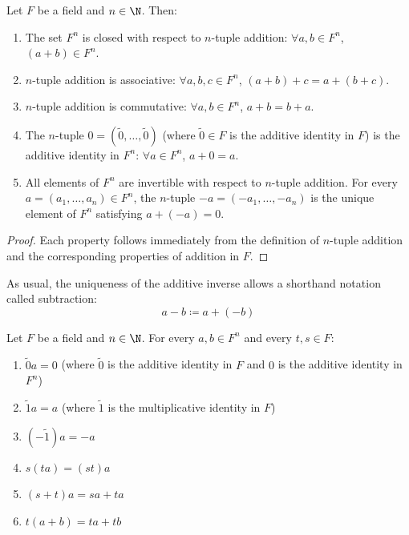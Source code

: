 \begin{theorem}\label{thm:tuple-addition-properties}
    Let $F$ be a field and $n \in \N$. Then:
    \begin{enumerate}[label=\roman*.]
        \item The set $F^n$ is closed with respect to $n$-tuple addition: $\forall a, b \in F^n$, $(a + b) \in F^n$.
        \item $n$-tuple addition is associative: $\forall a, b, c \in F^n$, $(a + b) + c = a + (b + c)$.
        \item $n$-tuple addition is commutative: $\forall a, b \in F^n$, $a + b = b + a$.
        \item The $n$-tuple $0 = (\tilde{0}, \ldots, \tilde{0})$ (where $\tilde{0} \in F$ is the additive identity in $F$) is the additive identity in $F^n$: $\forall a \in F^n$, $a + 0 = a$.
        \item All elements of $F^n$ are invertible with respect to $n$-tuple addition. For every $a = (a_1, \ldots, a_n) \in F^n$, the $n$-tuple $-a = (-a_1, \ldots, -a_n)$ is the unique element of $F^n$ satisfying $a + (-a) = 0$.
    \end{enumerate}
\end{theorem}

\begin{proof}
    Each property follows immediately from the definition of $n$-tuple addition and the corresponding properties of addition in $F$.
\end{proof}

\begin{notation}
    As usual, the uniqueness of the additive inverse allows a shorthand notation called subtraction:
    \[
    a - b \coloneqq a + (-b)
    \]
\end{notation}

\begin{theorem}\label{thm:scalar-mult-properties}
    Let $F$ be a field and $n \in \N$. For every $a, b \in F^n$ and every $t, s \in F$:
    \begin{enumerate}[label=\roman*.]
        \item $\tilde{0}a = 0$ (where $\tilde{0}$ is the additive identity in $F$ and $0$ is the additive identity in $F^n$)
        \item $\tilde{1}a = a$ (where $\tilde{1}$ is the multiplicative identity in $F$)
        \item $(-\tilde{1})a = -a$
        \item $s(ta) = (st)a$
        \item $(s + t)a = sa + ta$
        \item $t(a + b) = ta + tb$
    \end{enumerate}
\end{theorem}

